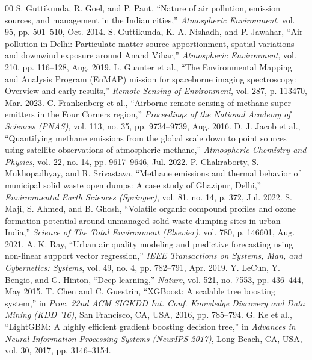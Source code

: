 \documentclass[conference]{IEEEtran}
\begin{document}
\begin{thebibliography}{00}
 S. Guttikunda, R. Goel, and P. Pant, ``Nature of air pollution, emission sources, and management in the Indian cities,'' \textit{Atmospheric Environment}, vol. 95, pp. 501--510, Oct. 2014.
 S. Guttikunda, K. A. Nishadh, and P. Jawahar, ``Air pollution in Delhi: Particulate matter source apportionment, spatial variations and downwind exposure around Anand Vihar,'' \textit{Atmospheric Environment}, vol. 210, pp. 116--128, Aug. 2019.
 L. Guanter et al., ``The Environmental Mapping and Analysis Program (EnMAP) mission for spaceborne imaging spectroscopy: Overview and early results,'' \textit{Remote Sensing of Environment}, vol. 287, p. 113470, Mar. 2023.
 C. Frankenberg et al., ``Airborne remote sensing of methane super-emitters in the Four Corners region,'' \textit{Proceedings of the National Academy of Sciences (PNAS)}, vol. 113, no. 35, pp. 9734--9739, Aug. 2016.
 D. J. Jacob et al., ``Quantifying methane emissions from the global scale down to point sources using satellite observations of atmospheric methane,'' \textit{Atmospheric Chemistry and Physics}, vol. 22, no. 14, pp. 9617--9646, Jul. 2022.
 P. Chakraborty, S. Mukhopadhyay, and R. Srivastava, ``Methane emissions and thermal behavior of municipal solid waste open dumps: A case study of Ghazipur, Delhi,'' \textit{Environmental Earth Sciences (Springer)}, vol. 81, no. 14, p. 372, Jul. 2022.
 S. Maji, S. Ahmed, and B. Ghosh, ``Volatile organic compound profiles and ozone formation potential around unmanaged solid waste dumping sites in urban India,'' \textit{Science of The Total Environment (Elsevier)}, vol. 780, p. 146601, Aug. 2021.
 A. K. Ray, ``Urban air quality modeling and predictive forecasting using non-linear support vector regression,'' \textit{IEEE Transactions on Systems, Man, and Cybernetics: Systems}, vol. 49, no. 4, pp. 782--791, Apr. 2019.
 Y. LeCun, Y. Bengio, and G. Hinton, ``Deep learning,'' \textit{Nature}, vol. 521, no. 7553, pp. 436--444, May 2015.
 T. Chen and C. Guestrin, ``XGBoost: A scalable tree boosting system,'' in \textit{Proc. 22nd ACM SIGKDD Int. Conf. Knowledge Discovery and Data Mining (KDD '16)}, San Francisco, CA, USA, 2016, pp. 785--794.
 G. Ke et al., ``LightGBM: A highly efficient gradient boosting decision tree,'' in \textit{Advances in Neural Information Processing Systems (NeurIPS 2017)}, Long Beach, CA, USA, vol. 30, 2017, pp. 3146--3154.

\end{thebibliography}
\end{document}
